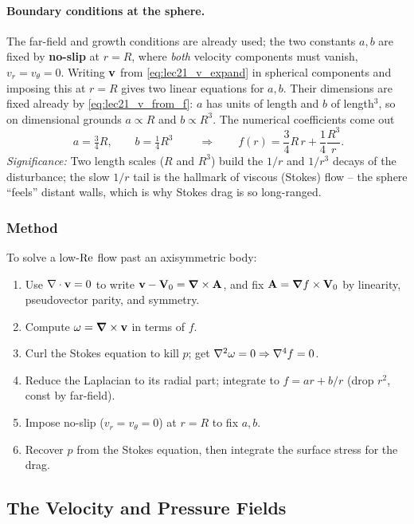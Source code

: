 \documentclass[../main.tex]{subfiles}
\begin{document}
\paragraph{Boundary conditions at the sphere.} The far-field and growth conditions are already used; the two constants $a,b$ are fixed by \textbf{no-slip} at $r=R$, where \emph{both} velocity components must vanish, $v_r=v_\theta=0$. Writing $\mathbf{v}$ from \eqref{eq:lec21_v_expand} in spherical components and imposing this at $r=R$ gives two linear equations for $a,b$. Their dimensions are fixed already by \eqref{eq:lec21_v_from_f}: $a$ has units of length and $b$ of length$^3$, so on dimensional grounds $a\propto R$ and $b\propto R^3$. The numerical coefficients come out
\begin{equation}
  \boxed{\;a=\tfrac34 R,\qquad b=\tfrac14 R^3\;}
  \qquad\Longrightarrow\qquad
  f(r)=\frac{3}{4}R\,r+\frac{1}{4}\frac{R^3}{r}.
  \label{eq:lec21_ab}
\end{equation}
\textit{Significance:} Two length scales ($R$ and $R^3$) build the $1/r$ and $1/r^3$ decays of the disturbance; the slow $1/r$ tail is the hallmark of viscous (Stokes) flow -- the sphere ``feels'' distant walls, which is why Stokes drag is so long-ranged.

\subsubsection*{Method}
To solve a low-$\mathrm{Re}$ flow past an axisymmetric body:
\begin{enumerate}
  \item Use $\nabla \cdot\mathbf{v}=0$ to write $\mathbf{v}-\mathbf{V}_0=\grad\times\mathbf{A}$, and fix $\mathbf{A}=\grad f\times\mathbf{V}_0$ by linearity, pseudovector parity, and symmetry.
  \item Compute $\mathbf{\omega}=\grad\times\mathbf{v}$ in terms of $f$.
  \item Curl the Stokes equation to kill $p$; get $\nabla^2\mathbf{\omega}=0\Rightarrow\nabla^4 f=0$.
  \item Reduce the Laplacian to its radial part; integrate to $f=ar+b/r$ (drop $r^2$, const by far-field).
  \item Impose no-slip ($v_r=v_\theta=0$) at $r=R$ to fix $a,b$.
  \item Recover $p$ from the Stokes equation, then integrate the surface stress for the drag.
\end{enumerate}

\subsection{The Velocity and Pressure Fields}\label{sec:lec21:fields}
\end{document}
